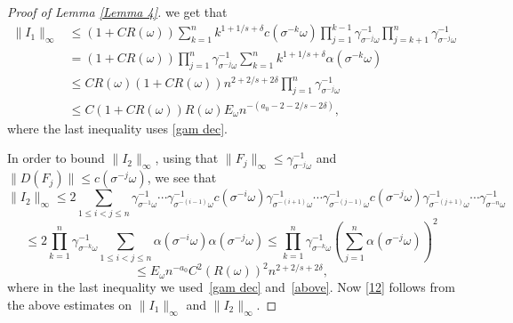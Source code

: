 \documentclass[10pt,a4paper]{amsart}
\def\om{\omega}
\begin{document}
\begin{proof}[Proof of Lemma \ref{Lemma 4}]
 we get that 
\[
\begin{split}
\|I_1\|_\infty &\leq (1+CR(\om))\sum_{k=1}^n k^{1+1/s+\delta}c(\sigma^{-k}\om)\prod_{j=1}^{k-1}\gamma_{\sigma^{-j}\om}^{-1}\prod_{j=k+1}^{n}\gamma_{\sigma^{-j}\om}^{-1} \\
&=(1+CR(\om))\prod_{j=1}^{n}\gamma_{\sigma^{-j}\om}^{-1}\sum_{k=1}^nk^{1+1/s+\delta}\alpha(\sigma^{-k}\om) \\
&\leq  
C R(\om)(1+CR(\om))n^{2+2/s+2\delta}\prod_{j=1}^n\gamma_{\sigma^{-j}\om}^{-1} \\
&\leq C(1+CR(\om))R(\om)E_\om n^{-(a_0-2-2/s-2\delta)},
 \end{split}
\]
 where  the last inequality  uses \eqref{gam dec}. 
 

In order to bound $\|I_2\|_\infty$, using that $\|F_j\|_\infty\leq \gamma_{\sigma^{-j}\om}^{-1}$ and $\|D(F_j)\|\leq c(\sigma^{-j}\om)$, we see that
  $$
\|I_2\|_\infty\leq 2\sum_{1\leq i<j\leq n}\gamma_{\sigma^{-1}\om}^{-1}\cdots \gamma_{\sigma^{-(i-1)}\om}^{-1}  c(\sigma^{-i}\om)\gamma_{\sigma^{-(i+1)}\om}^{-1}\cdots \gamma_{\sigma^{-(j-1)}\om}^{-1}c(\sigma^{-j}\om)\gamma_{\sigma^{-(j+1)}\om}^{-1}\cdots \gamma_{\sigma^{-n}\omega}^{-1}
$$
$$
\leq 2\prod_{k=1}^n\gamma_{\sigma^{-k}\om}^{-1} \sum_{1\leq i<j\leq n}\alpha(\sigma^{-i}\om)\alpha(\sigma^{-j}\om)\leq \prod_{k=1}^n\gamma_{\sigma^{-k}\om}^{-1}\left(\sum_{j=1}^n \alpha(\sigma^{-j}\om)\right)^2 
  $$
  $$
\leq E_\om n^{-a_0}C^2(R(\om))^2n^{2+2/s+2\delta},
  $$
  where in the last inequality we used~\eqref{gam dec} and~\eqref{above}. 
Now \eqref{12} follows from the above estimates on $\|I_1\|_\infty$ and $\|I_2\|_\infty$.


\end{proof}
\end{document}
